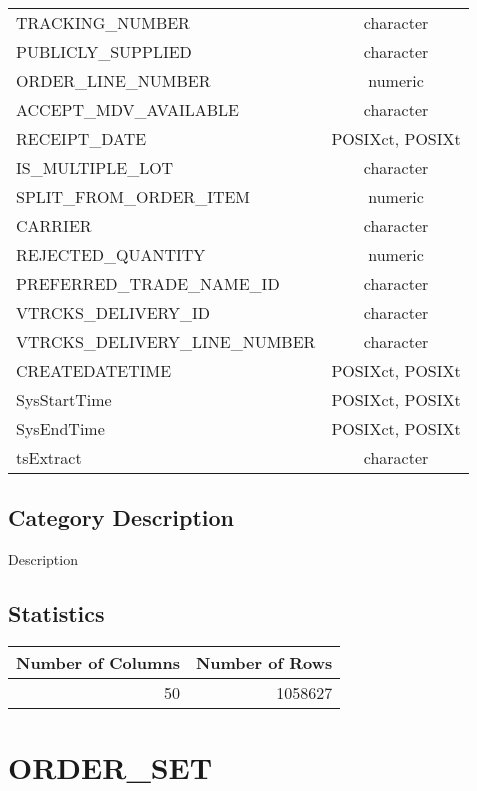 \documentclass[
  letterpaper,
  DIV=11,
  numbers=noendperiod]{scrreprt}
\begin{document}
\begin{longtable}{lc}
TRACKING\_NUMBER & character \\ 
PUBLICLY\_SUPPLIED & character \\ 
ORDER\_LINE\_NUMBER & numeric \\ 
ACCEPT\_MDV\_AVAILABLE & character \\ 
RECEIPT\_DATE & POSIXct, POSIXt \\ 
IS\_MULTIPLE\_LOT & character \\ 
SPLIT\_FROM\_ORDER\_ITEM & numeric \\ 
CARRIER & character \\ 
REJECTED\_QUANTITY & numeric \\ 
PREFERRED\_TRADE\_NAME\_ID & character \\ 
VTRCKS\_DELIVERY\_ID & character \\ 
VTRCKS\_DELIVERY\_LINE\_NUMBER & character \\ 
CREATEDATETIME & POSIXct, POSIXt \\ 
SysStartTime & POSIXct, POSIXt \\ 
SysEndTime & POSIXct, POSIXt \\ 
tsExtract & character \\ 
\bottomrule
\end{longtable}

\hypertarget{category-description-21}{%
\section*{Category Description}\label{category-description-21}}

Description

\hypertarget{statistics-21}{%
\section*{Statistics}\label{statistics-21}}

\begin{longtable}{rr}
\toprule
Number of Columns & Number of Rows \\ 
\midrule
50 & 1058627 \\ 
\bottomrule
\end{longtable}

\hypertarget{order_set}{%
\chapter*{ORDER\_SET}\label{order_set}}
\end{document}
